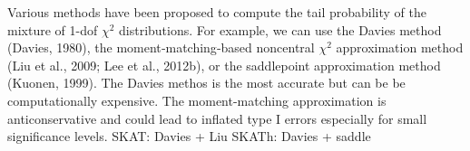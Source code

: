 Various methods have been proposed to compute the tail probability of the mixture of 1-dof $\chi^2$ distributions. 
For example, we can use the Davies method (Davies, 1980)\cite{davies1980algorithm}, the moment‐matching‐based noncentral $\chi^2$ approximation method \cite{liu2009new, lee2012optimal}(Liu et al., 2009; Lee et al., 2012b), or the saddlepoint approximation method (Kuonen, 1999). 
The Davies methos is the most accurate but can be be computationally expensive.
The moment-matching approximation is anticonservative and could lead to inflated type I errors especially for small significance levels.
SKAT: Davies + Liu
SKATh: Davies + saddle
\cite{wu2016efficient}










